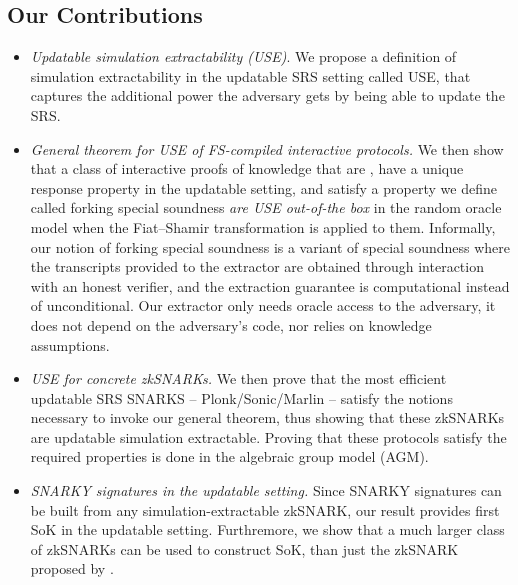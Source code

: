 \subsection{Our Contributions}
\begin{itemize}
\item 
\emph{Updatable simulation extractability (USE)}. 
We propose a definition of simulation extractability in the updatable SRS setting called USE, that captures the additional power the adversary gets by being able to update the SRS.%
    
\item 
\emph{General theorem for USE of FS-compiled interactive protocols.}
We then show that a class of interactive proofs of knowledge that are ,
have a unique response property in the updatable setting, and satisfy a property we define called forking special soundness \emph{are USE out-of-the box} in the random oracle model when the Fiat--Shamir transformation is applied to them. 
Informally, our notion of forking special soundness is a variant of special soundness where the transcripts provided to the extractor are
obtained through interaction with an honest verifier, and the extraction guarantee is computational instead of unconditional. 
Our extractor only needs oracle access to the adversary, it does not depend on the adversary’s code, nor relies on knowledge
assumptions.
    
\item
\emph{USE for concrete zkSNARKs.}
We then prove that the most efficient updatable SRS SNARKS -- Plonk/Sonic/Marlin -- satisfy the notions necessary to invoke our general theorem, thus showing that these zkSNARKs are updatable simulation extractable.
Proving that these protocols satisfy the required properties is done in the algebraic group model (AGM).

\item
  \emph{SNARKY signatures in the updatable setting.}
  Since SNARKY signatures can be built from any simulation-extractable zkSNARK, our result provides first SoK in the updatable setting. Furthremore, we show that a much larger class of zkSNARKs can be used to construct SoK, than just the zkSNARK proposed by \cite{C:GroMal17}.
	
\end{itemize}



